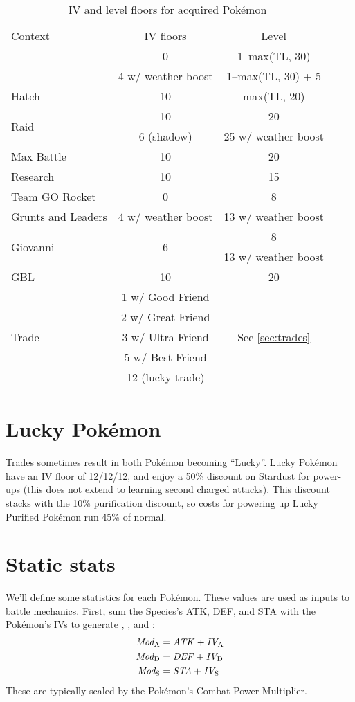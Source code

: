 \begin{table}
\centering
\begin{tabular}{lcc}
Context & IV floors & Level \\
\Midrule
\multirow{2}{*}{Wild catch} & 0 & 1--max(TL, 30) \\
& 4 w/ weather boost & 1--max(TL, 30) + 5 \\
Hatch & 10 & max(TL, 20) \\
\multirow{2}{*}{Raid} & 10 & 20 \\
& 6 (shadow) & 25 w/ weather boost \\
Max Battle & 10 & 20 \\
Research & 10 & 15 \\
Team GO Rocket & 0 & 8 \\
Grunts and Leaders & 4 w/ weather boost & 13 w/ weather boost \\
\multirow{2}{*}{Giovanni} & \multirow{2}{*}{6} & 8\\
& & 13 w/ weather boost\\
GBL & 10 & 20\\
\multirow{5}{*}{Trade} & 1 w/ Good Friend & \multirow{5}{*}{See \autoref{sec:trades}} \\
& 2 w/ Great Friend & \\
& 3 w/ Ultra Friend & \\
& 5 w/ Best Friend & \\
& 12 (lucky trade) & \\
\end{tabular}
\caption{IV and level floors for acquired Pokémon\label{table:ivfloors}}
\end{table}

\section{Lucky Pokémon\label{sec:lucky}}
Trades sometimes result in both Pokémon becoming ``Lucky''.
Lucky Pokémon have an IV floor of 12/12/12, and enjoy a 50\% discount on Stardust for power-ups
  (this does not extend to learning second charged attacks).
This discount stacks with the 10\% purification discount, so costs for
  powering up Lucky Purified Pokémon run 45\% of normal.

\section{Static stats\label{sec:staticstats}}
We'll define some statistics for each Pokémon.
These values are used as inputs to battle mechanics.
First, sum the Species's ATK, DEF, and STA with the Pokémon's
IVs to generate , , and :
\begin{align*}
 \mbox{$\mathit{Mod_\mathrm{A}}$} &= \mathit{ATK} + \mathit{\mbox{$\mathit{IV_\mathrm{A}}$}} \\
 \mbox{$\mathit{Mod_\mathrm{D}}$} &= \mathit{DEF} + \mathit{\mbox{$\mathit{IV_\mathrm{D}}$}} \\
 \mbox{$\mathit{Mod_\mathrm{S}}$} &= \mathit{STA} + \mathit{\mbox{$\mathit{IV_\mathrm{S}}$}}
\end{align*}
These are typically scaled by the Pokémon's Combat Power Multiplier.
